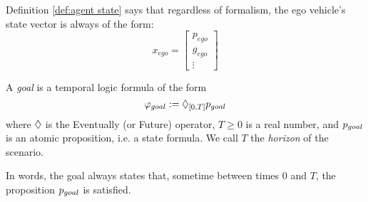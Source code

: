 Definition \ref{def:agent state} says that regardless of formalism, the ego vehicle's state vector is always of the form:
\begin{equation*}
x_{ego} = \left[\begin{matrix}
p_{ego}\\
g_{ego}\\
\vdots
\end{matrix}\right]
\end{equation*}

\begin{defn}
	\label{def:goal}
	A \emph{goal} is a temporal logic formula of the form 
	\[\varphi_{goal} := \Diamond_{[0,T]} p_{goal}\]
	where $\Diamond$ is the Eventually (or Future) operator, $T \geq 0$ is a real number, and 
	$p_{goal}$ is an atomic proposition, i.e. a state formula.
	We call $T$ the \emph{horizon} of the scenario.
\end{defn}
In words, the goal always states that, sometime between times 0 and $T$, the proposition $p_{goal}$ is satisfied.


